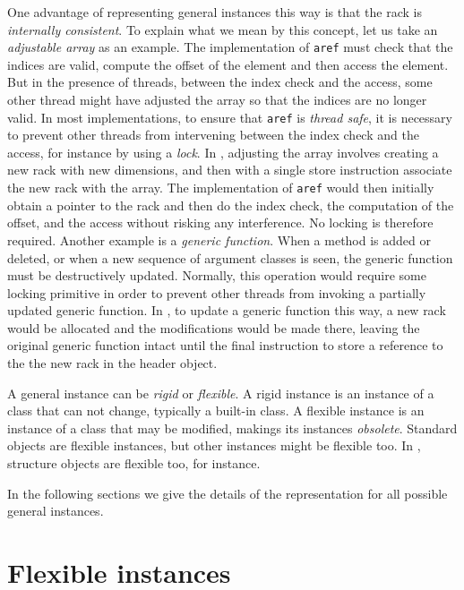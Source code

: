 One advantage of representing general instances this way is that the
rack is \emph{internally consistent}.  To explain what we
mean by this concept, let us take an \emph{adjustable array} as an
example.  The implementation of \texttt{aref} must check that the
indices are valid, compute the offset of the element and then access
the element.  But in the presence of threads, between the index check
and the access, some other thread might have adjusted the array so
that the indices are no longer valid.  In most implementations, to
ensure that \texttt{aref} is \emph{thread safe}, it is necessary to
prevent other threads from intervening between the index check and the
access, for instance by using a \emph{lock}.  In \sysname{}, adjusting
the array involves creating a new rack with new dimensions,
and then with a single store instruction associate the new rack
with the array.  The implementation of \texttt{aref} would then
initially obtain a pointer to the rack and then do the
index check, the computation of the offset, and the access without
risking any interference.  No locking is therefore required.  Another
example is a \emph{generic function}.  When a method is added or
deleted, or when a new sequence of argument classes is seen, the
generic function must be destructively updated.  Normally, this
operation would require some locking primitive in order to prevent
other threads from invoking a partially updated generic function.  In
\sysname{}, to update a generic function this way, a new rack
would be allocated and the modifications would be made there,
leaving the original generic function intact until the final
instruction to store a reference to the the new rack in the
header object. 

A general instance can be \emph{rigid} or \emph{flexible}.  A rigid
instance is an instance of a class that can not change, typically a
built-in class.  A flexible instance is an instance of a class that
may be modified, makings its instances \emph{obsolete}.  Standard
objects are flexible instances, but other instances might be flexible
too.  In \sysname{}, structure objects are flexible too, for
instance. 

In the following sections we give the details of the representation
for all possible general instances.

\section{Flexible instances}
\label{sec-data-representation-flexible-instances}

